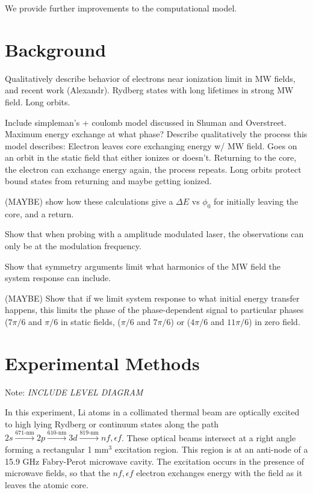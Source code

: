 \documentclass[aps,pra,preprint,groupedaddress]{revtex4-1}
\begin{document}
We provide further improvements to the computational model.


\section{\label{sec:back} Background}

Qualitatively describe behavior of electrons near ionization limit in MW fields, and recent work (Alexandr). Rydberg states with long lifetimes in strong MW field. Long orbits.

Include simpleman's + coulomb model discussed in Shuman and Overstreet. Maximum energy exchange at what phase? Describe qualitatively the process this model describes: Electron leaves core exchanging energy w/ MW field. Goes on an orbit in the static field that either ionizes or doesn't. Returning to the core, the electron can exchange energy again, the process repeats. Long orbits protect bound states from returning and maybe getting ionized.

(MAYBE) show how these calculations give a $\Delta E$ vs $\phi_0$ for initially leaving the core, and a return.

Show that when probing with a amplitude modulated laser, the observations can only be at the modulation frequency.

Show that symmetry arguments limit what harmonics of the MW field the system response can include.

(MAYBE) Show that if we limit system response to what initial energy transfer happens, this limits the phase of the phase-dependent signal to particular phases ($7\pi/6$ and $\pi/6$ in static fields, ($\pi/6$ and $7\pi/6$) or ($4\pi/6$ and $11\pi/6$) in zero field.

\section{\label{sec:exp} Experimental Methods}

Note: \emph{INCLUDE LEVEL DIAGRAM}

In this experiment, Li atoms in a collimated thermal beam are optically excited to high lying Rydberg or continuum states along the path $2s \xrightarrow{\text{671-nm}} 2p \xrightarrow{\text{610-nm}} 3d \xrightarrow{\text{819-nm}} nf, \epsilon f$. These optical beams intersect at a right angle forming a rectangular 1 mm$^3$ excitation region. This region is at an anti-node of a 15.9 GHz Fabry-Perot microwave cavity. The excitation occurs in the presence of microwave fields, so that the $nf, \epsilon f$ electron exchanges energy with the field as it leaves the atomic core.
\end{document}
